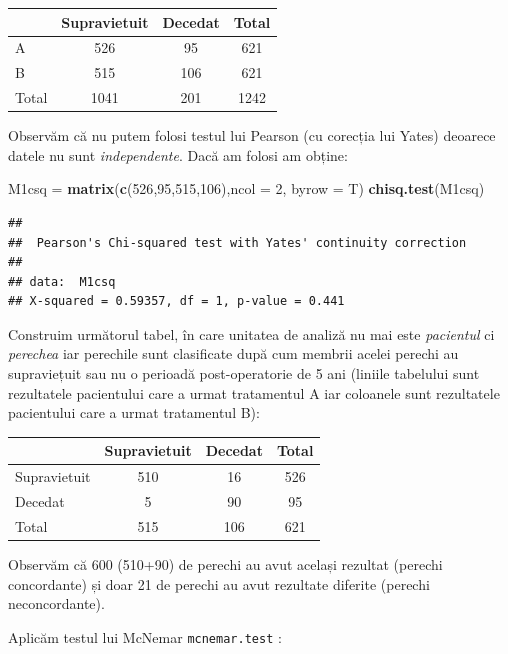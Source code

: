 \documentclass[]{article}
\newenvironment{Shaded}{\begin{snugshade}}{\end{snugshade}}
\newcommand{\KeywordTok}[1]{\textcolor[rgb]{0.13,0.29,0.53}{\textbf{{#1}}}}
\newcommand{\DataTypeTok}[1]{\textcolor[rgb]{0.13,0.29,0.53}{{#1}}}
\newcommand{\DecValTok}[1]{\textcolor[rgb]{0.00,0.00,0.81}{{#1}}}
\newcommand{\StringTok}[1]{\textcolor[rgb]{0.31,0.60,0.02}{{#1}}}
\newcommand{\NormalTok}[1]{{#1}}
\begin{document}
\begin{longtable}[]{@{}lccc@{}}
\toprule
& Supravietuit & Decedat & Total\tabularnewline
\midrule
\endhead
A & 526 & 95 & 621\tabularnewline
B & 515 & 106 & 621\tabularnewline
Total & 1041 & 201 & 1242\tabularnewline
\bottomrule
\end{longtable}

Observăm că nu putem folosi testul lui Pearson (cu corecția lui Yates)
deoarece datele nu sunt \emph{independente}. Dacă am folosi am obține:

\begin{Shaded}
\begin{Highlighting}[]
\NormalTok{M1csq =}\StringTok{ }\KeywordTok{matrix}\NormalTok{(}\KeywordTok{c}\NormalTok{(}\DecValTok{526}\NormalTok{,}\DecValTok{95}\NormalTok{,}\DecValTok{515}\NormalTok{,}\DecValTok{106}\NormalTok{),}\DataTypeTok{ncol =} \DecValTok{2}\NormalTok{, }\DataTypeTok{byrow =} \NormalTok{T)}
\KeywordTok{chisq.test}\NormalTok{(M1csq)}
\end{Highlighting}
\end{Shaded}

\begin{verbatim}
## 
##  Pearson's Chi-squared test with Yates' continuity correction
## 
## data:  M1csq
## X-squared = 0.59357, df = 1, p-value = 0.441
\end{verbatim}

Construim următorul tabel, în care unitatea de analiză nu mai este
\emph{pacientul} ci \emph{perechea} iar perechile sunt clasificate după
cum membrii acelei perechi au supraviețuit sau nu o perioadă
post-operatorie de 5 ani (liniile tabelului sunt rezultatele pacientului
care a urmat tratamentul A iar coloanele sunt rezultatele pacientului
care a urmat tratamentul B):

\begin{longtable}[]{@{}lccc@{}}
\toprule
& Supravietuit & Decedat & Total\tabularnewline
\midrule
\endhead
Supravietuit & 510 & 16 & 526\tabularnewline
Decedat & 5 & 90 & 95\tabularnewline
Total & 515 & 106 & 621\tabularnewline
\bottomrule
\end{longtable}

Observăm că 600 (510+90) de perechi au avut același rezultat (perechi
concordante) și doar 21 de perechi au avut rezultate diferite (perechi
neconcordante).

Aplicăm testul lui McNemar \texttt{mcnemar.test} :
\end{document}
